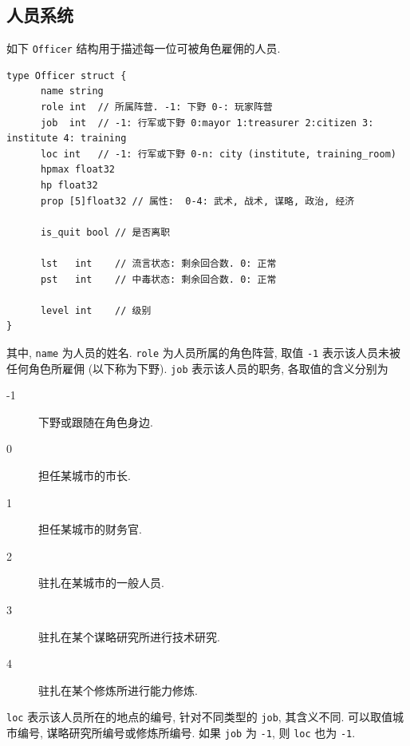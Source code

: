 \documentclass[UTF8, zihao=-4]{ctexart} %
\newcommand{\lcode}{\lstinline} % 段内插入代码
\begin{document}
\subsection{人员系统}
\label{s_people}
如下 \lcode{Officer} 结构用于描述每一位可被角色雇佣的人员.
\begin{lstlisting}
type Officer struct {
      name string
      role int  // 所属阵营. -1: 下野 0-: 玩家阵营                                            
      job  int  // -1: 行军或下野 0:mayor 1:treasurer 2:citizen 3: institute 4: training      
      loc int   // -1: 行军或下野 0-n: city (institute, training_room)                        
      hpmax float32
      hp float32
      prop [5]float32 // 属性:  0-4: 武术, 战术, 谋略, 政治, 经济

      is_quit bool // 是否离职

      lst   int    // 流言状态: 剩余回合数. 0: 正常
      pst   int    // 中毒状态: 剩余回合数. 0: 正常

      level int    // 级别
}
\end{lstlisting}
其中, \lcode{name} 为人员的姓名. \lcode{role} 为人员所属的角色阵营, 取值 \lcode{-1} 表示该人员未被任何角色所雇佣 (以下称为下野).
\lcode{job} 表示该人员的职务, 各取值的含义分别为
\begin{description}
      \item [-1] 下野或跟随在角色身边.
      \item [0] 担任某城市的市长.
      \item [1] 担任某城市的财务官.
      \item [2] 驻扎在某城市的一般人员.
      \item [3] 驻扎在某个谋略研究所进行技术研究.
      \item [4] 驻扎在某个修炼所进行能力修炼.
\end{description}
\lcode{loc} 表示该人员所在的地点的编号, 针对不同类型的 \lcode{job}, 其含义不同.
可以取值城市编号, 谋略研究所编号或修炼所编号. 如果 \lcode{job} 为 \lcode{-1}, 
则 \lcode{loc} 也为 \lcode{-1}.
\end{document}
